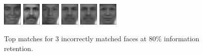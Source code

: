 \begin{figure}[hbt]
  \includegraphics[width=0.08\textwidth]{../results/H_rez/incorrect80/3/5.jpg}
  \includegraphics[width=0.08\textwidth]{../results/H_rez/incorrect80/3/6.jpg}
  \includegraphics[width=0.08\textwidth]{../results/H_rez/incorrect80/3/7.jpg}
  \includegraphics[width=0.08\textwidth]{../results/H_rez/incorrect80/3/8.jpg}
  \includegraphics[width=0.08\textwidth]{../results/H_rez/incorrect80/3/8.jpg}
  \includegraphics[width=0.08\textwidth]{../results/H_rez/incorrect80/3/10.jpg}
  \caption{Top matches for 3 incorrectly matched faces at 80\% information retention.}
  \label{fig:incorrect80}
\end{figure}

~\vfill

\clearpage

~\vfill

